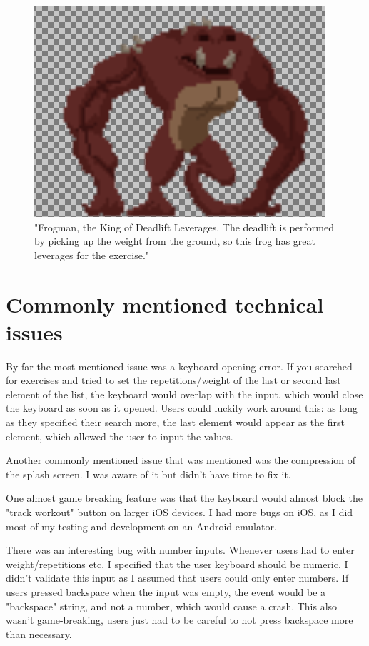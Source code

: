 \documentclass{l4proj}
\begin{document}
\begin{figure}[H]
    \centering
    \includegraphics[width=1.0\linewidth]{froggie.png}    
    \caption{
      "Frogman, the King of Deadlift Leverages. The deadlift is performed by picking up the weight from the ground, so this frog has great leverages for the exercise."
    }
    \label{fig:frogman} 
\end{figure}


\section{Commonly mentioned technical issues}
By far the most mentioned issue was a keyboard opening error. If you searched for exercises and tried to set the repetitions/weight of the last or second last element of the list, the keyboard would overlap with the input, which would close the keyboard as soon as it opened. Users could luckily work around this: as long as they specified their search more, the last element would appear as the first element, which allowed the user to input the values.

Another commonly mentioned issue that was mentioned was the compression of the splash screen. I was aware of it but didn't have time to fix it. 

One almost game breaking feature was that the keyboard would almost block the "track workout" button on larger iOS devices. I had more bugs on iOS, as I did most of my testing and development on an Android emulator.

There was an interesting bug with number inputs. Whenever users had to enter weight/repetitions etc. I specified that the user keyboard should be numeric. I didn't validate this input as I assumed that users could only enter numbers. If users pressed backspace when the input was empty, the event would be a "backspace" string, and not a number, which would cause a crash. This also wasn't game-breaking, users just had to be careful to not press backspace more than necessary.
\end{document}

